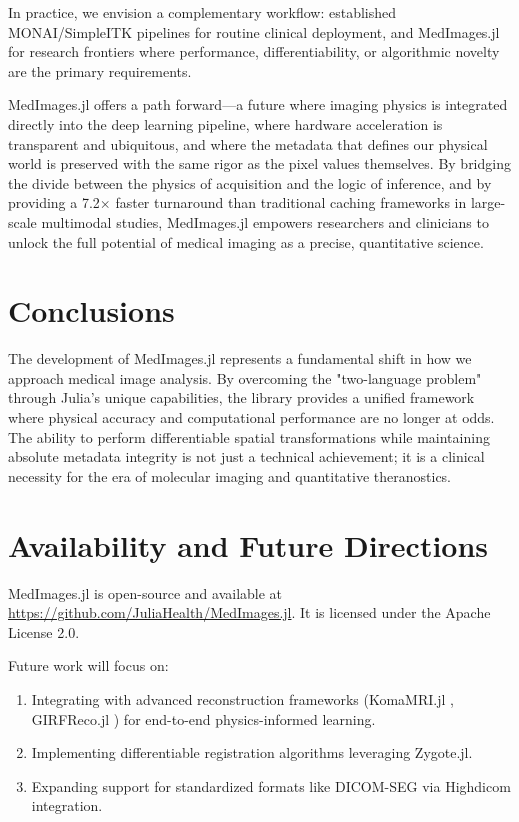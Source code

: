 \documentclass[10pt,letterpaper]{article}
\begin{document}
In practice, we envision a complementary workflow: established MONAI/SimpleITK pipelines for routine clinical deployment, and MedImages.jl for research frontiers where performance, differentiability, or algorithmic novelty are the primary requirements.

MedImages.jl offers a path forward---a future where imaging physics is integrated directly into the deep learning pipeline, where hardware acceleration is transparent and ubiquitous, and where the metadata that defines our physical world is preserved with the same rigor as the pixel values themselves. By bridging the divide between the physics of acquisition and the logic of inference, and by providing a 7.2$\times$ faster turnaround than traditional caching frameworks in large-scale multimodal studies, MedImages.jl empowers researchers and clinicians to unlock the full potential of medical imaging as a precise, quantitative science.


\section*{Conclusions}
The development of MedImages.jl represents a fundamental shift in how we approach medical image analysis. By overcoming the "two-language problem" through Julia's unique capabilities, the library provides a unified framework where physical accuracy and computational performance are no longer at odds. The ability to perform differentiable spatial transformations while maintaining absolute metadata integrity is not just a technical achievement; it is a clinical necessity for the era of molecular imaging and quantitative theranostics.

\section*{Availability and Future Directions}
MedImages.jl is open-source and available at \url{https://github.com/JuliaHealth/MedImages.jl}. It is licensed under the Apache License 2.0.

Future work will focus on:
\begin{enumerate}
    \item Integrating with advanced reconstruction frameworks (KomaMRI.jl \cite{CastilloPassiCoronado2023}, GIRFReco.jl \cite{JaffrayWu2024}) for end-to-end physics-informed learning.
    \item Implementing differentiable registration algorithms leveraging Zygote.jl.
    \item Expanding support for standardized formats like DICOM-SEG via Highdicom \cite{BridgeGorman2022} integration.
\end{enumerate}



\end{document}
